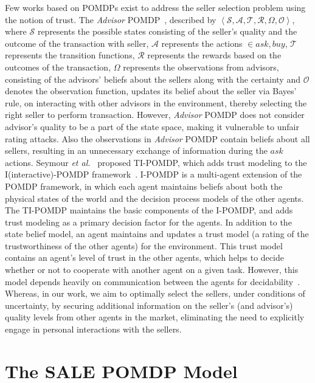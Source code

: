 \documentclass{aamas2013}
\providecommand{\SALEP}{SALE POMDP}
\begin{document}
Few works based on POMDPs exist to address the seller selection problem using the notion of trust. The \textit{Advisor} POMDP~\cite{regan2005advisor}, described by $\left\langle \mathcal{S},\mathcal{A},\mathcal{T},\mathcal{R},\Omega,\mathcal{O}\right\rangle$, where $\mathcal{S}$ represents the possible states consisting of the seller's quality and the outcome of the transaction with seller, $\mathcal{A}$ represents the actions $\in {ask, buy}$, $\mathcal{T}$ represents the transition functions, $\mathcal{R}$ represents the rewards based on the outcomes of the transaction, $\Omega$ represents the observations from advisors, consisting of the advisors' beliefs about the sellers along with the certainty and $\mathcal{O}$ denotes the observation function, updates its belief about the seller via Bayes' rule, on interacting with other advisors in the environment, thereby selecting the right seller to perform transaction. However, \textit{Advisor} POMDP does not consider advisor's quality to be a part of the state space, making it vulnerable to unfair rating attacks. Also the observations in \textit{Advisor} POMDP contain beliefs about all sellers, resulting in an unnecessary exchange of information during the $ask$ actions. Seymour \textit{et al.}~\cite{seymour2009trust} proposed TI-POMDP, which adds trust modeling to the I(interactive)-POMDP framework~\cite{gmytrasiewicz2005framework}. I-POMDP is a multi-agent extension of the POMDP framework, in which each agent maintains beliefs about both the physical states of the world and the decision process models of the other agents. The TI-POMDP maintains the basic components of the I-POMDP, and adds trust modeling as a primary decision factor for the agents. In addition to the state belief model, an agent maintains and updates a trust model (a rating of the trustworthiness of the other agents) for the environment. This trust model contains an agent's level of trust in the other agents, which helps to decide whether or not to cooperate with another agent on a given task. However, this model depends heavily on communication between the agents for decidability~\cite{mayo2010multi}. Whereas, in our work, we aim to optimally select the sellers, under conditions of uncertainty, by securing additional information on the seller's (and advisor's) quality levels from other agents in the market, eliminating the need to explicitly engage in personal interactions with the sellers.

\section{The \SALEP{} Model}\label{sec:3}
\end{document}
